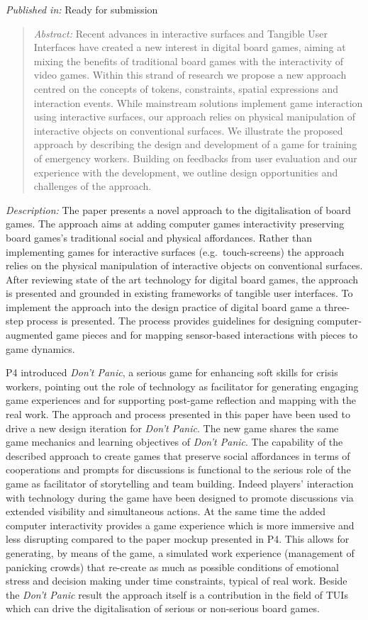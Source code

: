 \emph{Published in:} Ready for submission

\begin{quote}
\emph{Abstract:} Recent advances in interactive surfaces and Tangible
User Interfaces have created a new interest in digital board games,
aiming at mixing the benefits of traditional board games with the
interactivity of video games. Within this strand of research we propose
a new approach centred on the concepts of tokens, constraints, spatial
expressions and interaction events. While mainstream solutions implement
game interaction using interactive surfaces, our approach relies on
physical manipulation of interactive objects on conventional surfaces.
We illustrate the proposed approach by describing the design and
development of a game for training of emergency workers. Building on
feedbacks from user evaluation and our experience with the development,
we outline design opportunities and challenges of the approach.
\end{quote}

\emph{Description:} The paper presents a novel approach to the
digitalisation of board games. The approach aims at adding computer
games interactivity preserving board games's traditional social and
physical affordances. Rather than implementing games for interactive
surfaces (e.g.~touch-screens) the approach relies on the physical
manipulation of interactive objects on conventional surfaces. After
reviewing state of the art technology for digital board games, the
approach is presented and grounded in existing frameworks of tangible
user interfaces. To implement the approach into the design practice of
digital board game a three-step process is presented. The process
provides guidelines for designing computer-augmented game pieces and for
mapping sensor-based interactions with pieces to game dynamics.

P4 introduced \emph{Don't Panic}, a serious game for enhancing soft
skills for crisis workers, pointing out the role of technology as
facilitator for generating engaging game experiences and for supporting
post-game reflection and mapping with the real work. The approach and
process presented in this paper have been used to drive a new design
iteration for \emph{Don't Panic}. The new game shares the same game
mechanics and learning objectives of \emph{Don't Panic}. The capability
of the described approach to create games that preserve social
affordances in terms of cooperations and prompts for discussions is
functional to the serious role of the game as facilitator of
storytelling and team building. Indeed players' interaction with
technology during the game have been designed to promote discussions via
extended visibility and simultaneous actions. At the same time the added
computer interactivity provides a game experience which is more
immersive and less disrupting compared to the paper mockup presented in
P4. This allows for generating, by means of the game, a simulated work
experience (management of panicking crowds) that re-create as much as
possible conditions of emotional stress and decision making under time
constraints, typical of real work. Beside the \emph{Don't Panic} result
the approach itself is a contribution in the field of TUIs which can
drive the digitalisation of serious or non-serious board games.

